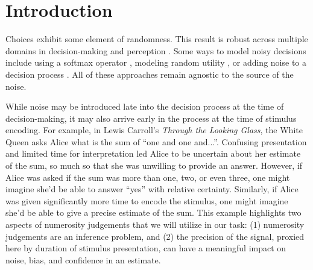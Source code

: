 \section*{Introduction}

\begin{center}
\end{center}

Choices exhibit some element of randomness.
This result is robust across multiple domains in decision-making and perception \cite{smith_attention_2018, prat-carrabin_efficient_2022}. %
Some ways to model noisy decisions include using a softmax operator \cite{glascher_states_2010}, modeling random utility \cite{}, or adding noise to a decision process \cite{forstmann_sequential_2016}.
All of these approaches remain agnostic to the source of the noise.

While noise may be introduced late into the decision process at the time of decision-making, it may also arrive early in the process at the time of stimulus encoding.
For example, in Lewis Carroll's \textit{Through the Looking Glass}, the White Queen asks Alice what is the sum of ``one and one and...''.
Confusing presentation and limited time for interpretation led Alice to be uncertain about her estimate of the sum, so much so that she was unwilling to provide an answer.
However, if Alice was asked if the sum was more than one, two, or even three, one might imagine she'd be able to answer ``yes'' with relative certainty.
Similarly, if Alice was given significantly more time to encode the stimulus, one might imagine she'd be able to give a precise estimate of the sum.
This example highlights two aspects of numerosity judgements that we will utilize in our task: (1) numerosity judgements are an inference problem, and (2) the precision of the signal, proxied here by duration of stimulus presentation, can have a meaningful impact on noise, bias, and confidence in an estimate.

